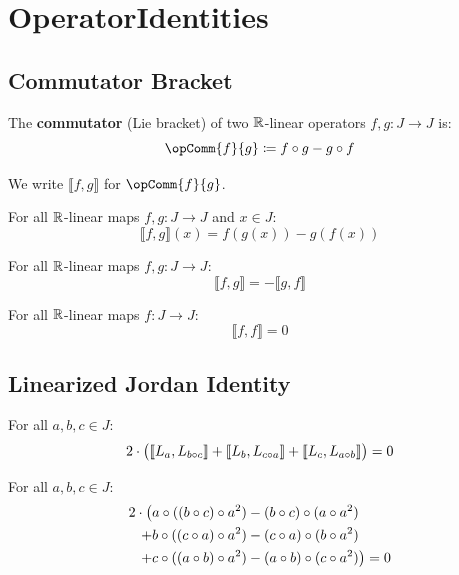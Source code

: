 \section{OperatorIdentities}

\subsection{Commutator Bracket}

\begin{definition}[opComm]
The \textbf{commutator} (Lie bracket) of two $\mathbb{R}$-linear operators $f, g : J \to J$ is:
\[ \opComm{f}{g} \defas f \circ g - g \circ f \]
\end{definition}

\begin{notation}
We write $\llbracket f, g \rrbracket$ for $\opComm{f}{g}$.
\end{notation}

\begin{lemma}
For all $\mathbb{R}$-linear maps $f, g : J \to J$ and $x \in J$:
\[ \llbracket f, g \rrbracket(x) = f(g(x)) - g(f(x)) \]
\end{lemma}

\begin{lemma}
For all $\mathbb{R}$-linear maps $f, g : J \to J$:
\[ \llbracket f, g \rrbracket = -\llbracket g, f \rrbracket \]
\end{lemma}

\begin{lemma}
For all $\mathbb{R}$-linear maps $f : J \to J$:
\[ \llbracket f, f \rrbracket = 0 \]
\end{lemma}

\subsection{Linearized Jordan Identity}

\begin{theorem}
For all $a, b, c \in J$:
\[ 2 \cdot \bigl( \llbracket L_{a}, L_{b \circ c} \rrbracket + \llbracket L_{b}, L_{c \circ a} \rrbracket + \llbracket L_{c}, L_{a \circ b} \rrbracket \bigr) = 0 \]
\end{theorem}

\begin{theorem}
For all $a, b, c \in J$:
\begin{align*}
2 \cdot \bigl( &a \circ ((b \circ c) \circ a^{2}) - (b \circ c) \circ (a \circ a^{2}) \\
+ &b \circ ((c \circ a) \circ a^{2}) - (c \circ a) \circ (b \circ a^{2}) \\
+ &c \circ ((a \circ b) \circ a^{2}) - (a \circ b) \circ (c \circ a^{2}) \bigr) = 0
\end{align*}
\end{theorem}

